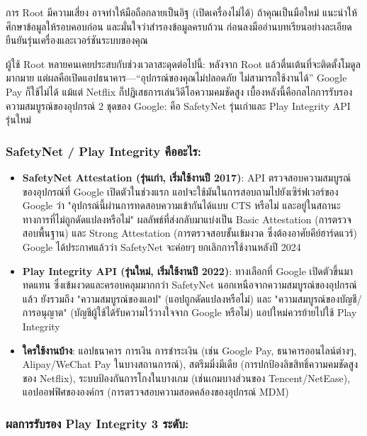การ Root มีความเสี่ยง อาจทำให้มือถือกลายเป็นอิฐ (เปิดเครื่องไม่ได้) ถ้าคุณเป็นมือใหม่ แนะนำให้ศึกษาข้อมูลให้รอบคอบก่อน และมั่นใจว่าสำรองข้อมูลครบถ้วน ก่อนลงมืออ่านบทเรียนอย่างละเอียด ยืนยันรุ่นเครื่องและเวอร์ชันระบบของคุณ


ผู้ใช้ Root หลายคนเคยประสบกับช่วงเวลาสะดุดต่อไปนี้: หลังจาก Root แล้วตื่นเต้นที่จะติดตั้งโมดูลมากมาย แต่ผลคือเปิดแอปธนาคาร—“อุปกรณ์ของคุณไม่ปลอดภัย ไม่สามารถใช้งานได้” Google Pay ก็ใช้ไม่ได้ แม้แต่ Netflix ก็ปฏิเสธการเล่นวิดีโอความคมชัดสูง เบื้องหลังนี้คือกลไกการรับรองความสมบูรณ์ของอุปกรณ์ 2 ชุดของ Google: คือ SafetyNet รุ่นเก่าและ Play Integrity API รุ่นใหม่

\subsubsection*{SafetyNet / Play Integrity คืออะไร:}

\begin{itemize}
  \item \textbf{SafetyNet Attestation (รุ่นเก่า, เริ่มใช้งานปี 2017)}: API ตรวจสอบความสมบูรณ์ของอุปกรณ์ที่ Google เปิดตัวในช่วงแรก แอปจะใช้มันในการสอบถามไปยังเซิร์ฟเวอร์ของ Google ว่า "อุปกรณ์นี้ผ่านการทดสอบความเข้ากันได้แบบ CTS หรือไม่ และอยู่ในสถานะทางการที่ไม่ถูกดัดแปลงหรือไม่" ผลลัพธ์ที่ส่งกลับมาแบ่งเป็น Basic Attestation (การตรวจสอบพื้นฐาน) และ Strong Attestation (การตรวจสอบขั้นเข้มงวด ซึ่งต้องอาศัยคีย์ฮาร์ดแวร์) Google ได้ประกาศแล้วว่า SafetyNet จะค่อยๆ ยกเลิกการใช้งานหลังปี 2024
  \item \textbf{Play Integrity API (รุ่นใหม่, เริ่มใช้งานปี 2022)}: ทางเลือกที่ Google เปิดตัวขึ้นมาทดแทน ซึ่งเข้มงวดและครอบคลุมมากกว่า SafetyNet นอกเหนือจากความสมบูรณ์ของอุปกรณ์แล้ว ยังรวมถึง "ความสมบูรณ์ของแอป" (แอปถูกดัดแปลงหรือไม่) และ "ความสมบูรณ์ของบัญชี/การอนุญาต" (บัญชีผู้ใช้ได้รับความไว้วางใจจาก Google หรือไม่) แอปใหม่ควรย้ายไปใช้ Play Integrity
  \item \textbf{ใครใช้งานบ้าง}: แอปธนาคาร การเงิน การชำระเงิน (เช่น Google Pay, ธนาคารออนไลน์ต่างๆ, Alipay/WeChat Pay ในบางสถานการณ์), สตรีมมิ่งมีเดีย (การปกป้องลิขสิทธิ์ความคมชัดสูงของ Netflix), ระบบป้องกันการโกงในบางเกม (เช่นเกมบางส่วนของ Tencent/NetEase), แอปออฟฟิศขององค์กร (การตรวจสอบความสอดคล้องของอุปกรณ์ MDM)
\end{itemize}

\subsubsection*{ผลการรับรอง Play Integrity 3 ระดับ:}

